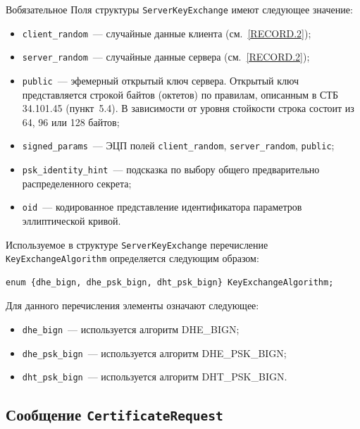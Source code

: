 \begin{appendix}{В}{обязательное}
Поля структуры \lstinline{ServerKeyExchange} имеют следующее значение:
\begin{itemize}
\item [--]
\lstinline{client_random}~--- случайные данные клиента (см.~\ref{RECORD.2});

\item [--]
\lstinline{server_random}~--- случайные данные сервера (см.~\ref{RECORD.2});

\item [--]
\lstinline{public}~--- эфемерный открытый ключ сервера. Открытый ключ 
представляется строкой байтов (октетов) по правилам, описанным в СТБ~
34.101.45 (пункт~5.4). В зависимости от уровня стойкости строка состоит из 
64, 96 или 128 байтов; 

\item [--]
\lstinline{signed_params}~--- ЭЦП полей \lstinline{client_random}, 
\lstinline{server_random}, \lstinline{public}; 

\item [--]
\lstinline{psk_identity_hint}~--- подсказка по выбору общего 
предварительно распределенного секрета; 

\item [--]
\lstinline{oid}~--- кодированное представление идентификатора параметров 
эллиптической кривой. 
\end{itemize}

Используемое в структуре \lstinline{ServerKeyExchange} перечисление 
\lstinline{KeyExchangeAlgorithm} определяется следующим образом: 
\begin{lstlisting}
enum {dhe_bign, dhe_psk_bign, dht_psk_bign} KeyExchangeAlgorithm;
\end{lstlisting}

Для данного перечисления элементы означают следующее:
\begin{itemize}
\item[--]
\lstinline{dhe_bign}~--- используется алгоритм DHE\_BIGN;

\item[--]
\lstinline{dhe_psk_bign}~--- используется алгоритм DHE\_PSK\_BIGN;

\item[--]
\lstinline{dht_psk_bign}~--- используется алгоритм DHT\_PSK\_BIGN.
\end{itemize}

\subsection{Сообщение \lstinline{CertificateRequest}}\label{BSUITES.4.5} 


\end{appendix}
